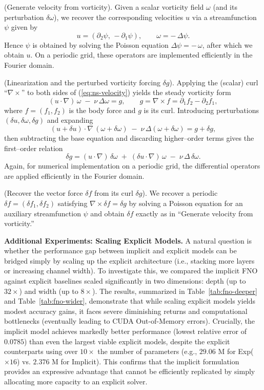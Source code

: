 \documentclass{amsart} %
\def\eqref#1{equation~\ref{#1}}
\theoremstyle{definition}
\theoremstyle{remark}
\renewcommand{\eqref}[1]{\textup{(\ref{#1})}}
\begin{document}
(Generate velocity from vorticity).
Given a scalar vorticity field $\omega$ (and its perturbation $\delta\omega$), we recover the corresponding velocities $u$ via a streamfunction $\psi$ given by
\[
u = (\partial_2 \psi,\,-\partial_1 \psi),
\qquad
\omega = -\,\Delta \psi .
\]
Hence $\psi$ is obtained by solving the Poisson equation $\Delta \psi = -\,\omega$, after which we obtain $u$.
On a periodic grid, these operators are implemented efficiently in the Fourier domain. 


(Linearization and the perturbed vorticity forcing $\delta g$).
Applying the (scalar) curl ``$\nabla\times$'' to both sides of \eqref{eq:ns-velocity} yields the steady vorticity form
\[
(u\!\cdot\!\nabla)\,\omega \;-\; \nu\,\Delta \omega = g,
\qquad
g = \nabla\times f = \partial_1 f_2 - \partial_2 f_1 ,
\]
where $f=(f_1,f_2)$ is the body force and $g$ is its curl. Introducing perturbations $(\delta u,\delta\omega,\delta g)$ and expanding
\[
(u+\delta u)\!\cdot\!\nabla\,(\omega+\delta\omega) \;-\; \nu\,\Delta(\omega+\delta\omega)
= g+\delta g,
\]
then subtracting the base equation and discarding higher–order terms gives the first–order relation
\[
\delta g
=
(u\!\cdot\!\nabla)\,\delta\omega
\;+\;
(\delta u\!\cdot\!\nabla)\,\omega
\;-\;
\nu\,\Delta\,\delta\omega .
\]
Again, for numerical implementation on a periodic grid, the differential operators are applied efficiently in the Fourier domain.

(Recover the vector force $\delta f$ from its curl $\delta g$).
We recover a periodic $\delta f=(\delta f_1,\delta f_2)$ satisfying $\nabla\times\delta f=\delta g$ by solving a Poisson equation for an auxiliary streamfunction $\psi$ and obtain $\delta f$ exactly as in ``Generate velocity from vorticity.''








\textbf{Additional Experiments: Scaling Explicit Models.} A natural question is whether the performance gap between implicit and explicit models can be bridged simply by scaling up the explicit architecture (i.e., stacking more layers or increasing channel width). To investigate this, we compared the implicit FNO against explicit baselines scaled significantly in two dimensions: depth (up to $32\times$) and width (up to $8\times$). The results, summarized in Table~\ref{tab:fno-deeper} and Table~\ref{tab:fno-wider}, demonstrate that while scaling explicit models yields modest accuracy gains, it faces severe diminishing returns and computational bottlenecks (eventually leading to CUDA Out-of-Memory errors). Crucially, the implicit model achieves markedly better performance (lowest relative error of $0.0785$) than even the largest viable explicit models, despite the explicit counterparts using over $10\times$ the number of parameters (e.g., $29.06$ M for Exp($\times 16$) vs. $2.376$ M for Implicit). This confirms that the implicit formulation provides an expressive advantage that cannot be efficiently replicated by simply allocating more capacity to an explicit solver.
\end{document}
